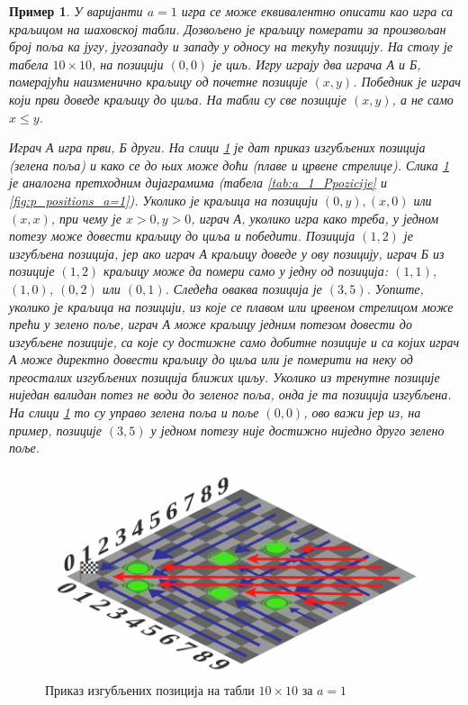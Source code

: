 \documentclass[a4paper]{article}
\newtheorem{example}{Пример}
\begin{document}
\begin{example}
	У варијанти $ a = 1 $ игра се може еквивалентно описати као игра са краљицом на шаховској табли. Дозвољено је краљицу померати за произвољан број поља ка југу, југозападу и западу у односу на текућу позицију. На столу је табела $ 10\times10 $, на позицији $ (0, 0) $ је циљ. Игру играју два играча \textit{А} и \textit{Б}, померајући наизменично краљицу од почетне позиције $ (x,y) $. Победник је играч који први доведе краљицу до циља. На табли су све позиције $ (x, y) $, а не само $ x \leq y $.
	
	Играч \textit{А} игра први, \textit{Б} други. На слици \ref{fig:sahovska_tabla_pozicije_a_1} је дат приказ изгубљених позиција (зелена поља) и како се до њих може доћи (плаве и црвене стрелице). Слика \ref{fig:sahovska_tabla_pozicije_a_1} је аналогна претходним дијаграмима (табела \ref{tab:a_1_Ppozicije} и \ref{fig:p_positions_a=1}). Уколико је краљица на позицији $ (0, y), (x,0) $ или $ (x,x) $, при чему је $ x > 0, y > 0 $, играч \textit{А}, уколико игра како треба, у једном потезу може довести краљицу до циља и победити. Позиција $ (1, 2) $ је изгубљена позиција, јер ако играч \textit{А} краљицу доведе у ову позицију, играч \textit{Б} из позиције $ (1, 2) $ краљицу може да помери само у једну од позиција: $ (1, 1) $, $ (1, 0) $, $ (0, 2) $ или $ (0, 1) $. Следећа оваква позиција је $ (3, 5) $. Уопште, уколико је краљица на позицији, из које се плавом или црвеном стрелицом може прећи у зелено поље, играч \textit{А} може краљицу једним потезом довести до изгубљене позиције, са које су достижне само добитне позиције и са којих играч \textit{А} може директно довести краљицу до циља или је померити на неку од преосталих изгубљених позиција ближих циљу. Уколико из тренутне позиције ниједан валидан потез не води до зеленог поља, онда је та позиција изгубљена. На слици \ref{fig:sahovska_tabla_pozicije_a_1} то су управо зелена поља и поље $ (0, 0) $, ово важи јер из, на пример, позиције $ (3, 5) $ у једном потезу није достижно ниједно друго зелено поље.
\end{example}
 
\begin{figure}[H]
	\begin{center}
		\includegraphics[width=\textwidth]{10x10_a1.png}
	\end{center}
	\caption{Приказ изгубљених позиција на табли $ 10 \times 10 $ за $ a = 1 $}
	\label{fig:sahovska_tabla_pozicije_a_1}
\end{figure}
\end{document}
